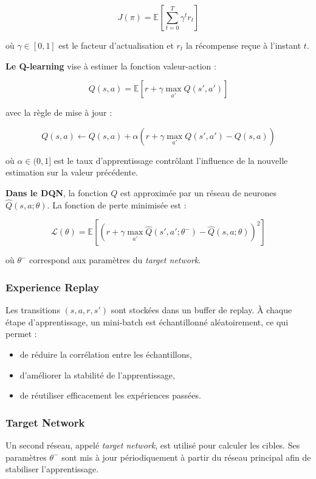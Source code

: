 \[
J(\pi) = \mathbb{E}\left[\sum_{t=0}^{T} \gamma^t r_t\right]
\]

où $\gamma \in [0,1]$ est le facteur d'actualisation et $r_t$ la récompense reçue à l'instant $t$.

\textbf{Le Q-learning} vise à estimer la fonction valeur-action :

\[
Q(s,a) = \mathbb{E}\left[r + \gamma \max_{a'} Q(s',a')\right]
\]

avec la règle de mise à jour :

\[
Q(s,a) \leftarrow Q(s,a) + \alpha \left(r + \gamma \max_{a'} Q(s',a') - Q(s,a)\right)
\]

où $\alpha \in (0,1]$ est le taux d'apprentissage contrôlant l'influence
de la nouvelle estimation sur la valeur précédente.

\textbf{Dans le DQN}, la fonction $Q$ est approximée par un réseau de neurones $\hat{Q}(s,a;\theta)$. La fonction de perte minimisée est :

\[
\mathcal{L}(\theta) =
\mathbb{E}\left[
\left(
r + \gamma \max_{a'} \hat{Q}(s',a';\theta^-)
- \hat{Q}(s,a;\theta)
\right)^2
\right]
\]

où $\theta^-$ correspond aux paramètres du \textit{target network}.

\subsubsection{Experience Replay}

Les transitions $(s,a,r,s')$ sont stockées dans un buffer de replay. À chaque étape d'apprentissage, un mini-batch est échantillonné aléatoirement, ce qui permet :
\begin{itemize}
    \item de réduire la corrélation entre les échantillons,
    \item d'améliorer la stabilité de l'apprentissage,
    \item de réutiliser efficacement les expériences passées.
\end{itemize}

\subsubsection{Target Network}

Un second réseau, appelé \textit{target network}, est utilisé pour calculer les cibles. Ses paramètres $\theta^-$ sont mis à jour périodiquement à partir du réseau principal afin de stabiliser l'apprentissage.


